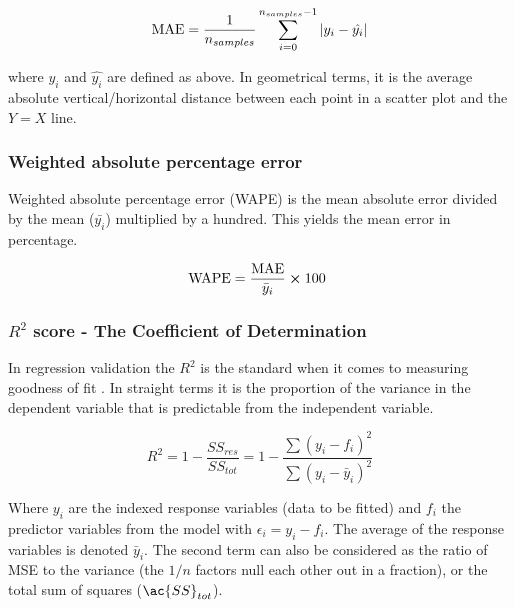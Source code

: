 \begin{align}\label{eq:MAE}
\text{MAE} = \frac{1}{n_{samples}}\sum^{n_{samples}-1}_{i=0}\abs{y_i - \hat{y_i}}
\end{align}

where $y_i$ and $\hat{y_i}$ are defined as above. In geometrical terms, it is the average absolute vertical/horizontal distance between each point in a scatter plot and the $Y=X$ line. 

\subsubsection{Weighted absolute percentage error}

Weighted absolute percentage error (\ac{WAPE}) is the mean absolute error divided by the mean ($\bar{y_i}$) multiplied by a hundred. This yields the mean error in percentage. 

\begin{align}\label{eq:WAPE}
\text{WAPE} = \frac{\text{MAE}}{\bar{y}_{i}} \cross 100 
\end{align}
 


\subsubsection{$R^2$ score - The Coefficient of Determination}

	In regression validation the $R^2$ is the standard when it comes to measuring goodness of fit \cite{james2013introduction}. In straight terms it is the proportion of the variance in the dependent variable that is predictable from the independent variable.

\begin{equation}\label{eq: R squared}
	R^2 =1 - \frac{SS_{res}}{SS_{tot}} =  1 - \frac{ \sum(y_i-f_i)^2 }{ \sum(y_i-\bar{y}_i)^2 }
\end{equation}

	Where $y_i$ are the indexed response variables (data  to be fitted) and $f_i$ the predictor variables from the model with $\epsilon_i = y_i - f_i$. The average of the response variables is denoted $\bar{y}_i$. The second term can also be considered as the ratio of MSE to the variance (the $1/n$ factors null each other out in a fraction), or the total sum of squares ($\ac{SS}_{tot}$). 
	
